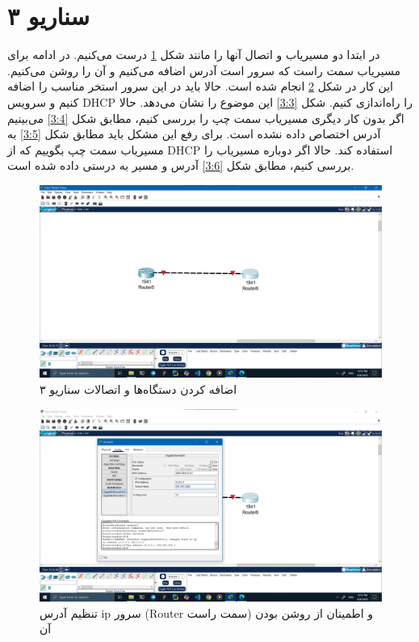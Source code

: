 \documentclass[12pt]{article}
\begin{document}
	\section{سناریو ۳}
	در ابتدا دو مسیریاب و اتصال آنها را مانند شکل \ref{3:1} درست می‌کنیم. در ادامه برای مسیر‌یاب سمت راست که سرور است آدرس اضافه می‌کنیم و آن را روشن می‌کنیم. این کار در شکل \ref{3:2} انجام شده است. حالا باید در این سرور استخر‌ مناسب را اضافه کنیم و سرویس \textenglish{DHCP} را راه‌اندازی کنیم. شکل \ref{3:3} این موضوع را نشان‌ می‌دهد. حالا اگر بدون کار دیگری مسیریاب سمت چپ را بررسی کنیم، مطابق شکل \ref{3:4} می‌بینیم آدرس اختصاص داده نشده است. برای رفع این مشکل باید مطابق شکل \ref{3:5} به مسیریاب سمت چپ بگوییم که از \textenglish{DHCP} استفاده کند. حالا اگر دوباره مسیریاب را بررسی کنیم، مطابق شکل \ref{3:6} آدرس و مسیر به درستی داده شده است.
	\begin{figure}[H]
		\centering
		\includegraphics[width=\textwidth]{resources/scenario3-1.png}
		\caption{اضافه کردن دستگاه‌ها و اتصالات سناریو ۳}
		\label{3:1}
	\end{figure}
	\begin{figure}[H]
		\centering
		\includegraphics[width=\textwidth]{resources/scenario3-2.png}
		\caption{تنظیم آدرس \textenglish{ip} سرور (\textenglish{Router} سمت راست) و اطمینان از روشن بودن آن}
		\label{3:2}
	\end{figure}
\end{document}
